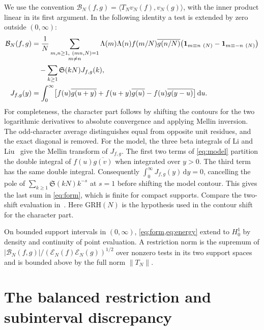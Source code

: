 \documentclass[11pt,a4paper]{article}
\numberwithin{equation}{section}
\newcommand{\SSS}{\mathfrak S}
\newcommand{\grh}{\mathrm{GRH}}
\newcommand{\ud}{\mathrm d}
\newcommand{\E}{\mathcal E_N}
\newcommand{\B}{\mathcal B_N}
\begin{document}
We use the convention $\B(f,g)=\langle T_N v_N(f),v_N(g)\rangle$,
with the inner product linear in its first argument. In the following
identity a test is extended by zero outside $(0,\infty)$:
\begin{align}
 \B(f,g)
  &=\frac1N
    \sum_{\substack{m,n\ge1,\ (mn,N)=1\\m\ne n}}
      \Lambda(m)\Lambda(n)f(m/N)\overline{g(n/N)}
      \bigl(\mathbf 1_{m\equiv n\ (N)}-\mathbf 1_{m\equiv -n\ (N)}\bigr)
    \notag\\
  &\quad-\sum_{k\ge1}\SSS(kN)J_{f,g}(k),
  \label{eq:form}\\
 J_{f,g}(y)
  &=\int_0^\infty \bigl[
      f(u)\overline{g(u+y)}
      +f(u+y)\overline{g(u)}
      -f(u)\overline{g(y-u)}
      \bigr]\,\ud u.
  \label{eq:model}
\end{align}
For completeness, the character part follows by shifting the contours for
the two logarithmic derivatives to absolute convergence and applying
Mellin inversion. The odd-character average distinguishes equal from
opposite unit residues, and the exact diagonal is removed. For the model,
the three beta integrals of Li and Liu~\cite[Lemma~7.2]{LiLiu} give the
Mellin transform of $J_{f,g}$. The first two terms of \cref{eq:model}
partition the double integral of $f(u)\overline{g(v)}$ when integrated
over $y>0$. The third term has the same double integral. Consequently
$\int_0^\infty J_{f,g}(y)\,\ud y=0$, cancelling the pole of
$\sum_{k\ge1}\SSS(kN)k^{-s}$ at $s=1$ before shifting the model contour.
This gives the last sum in \cref{eq:form}, which is finite for compact
supports. Compare the two-shift evaluation in~\cite[Lemma~2.1]{YLiu}.
Here $\grh(N)$ is the hypothesis used in the contour shift for the
character part.

On bounded support intervals in $(0,\infty)$, \cref{eq:form,eq:energy}
extend to $H^1_0$ by density and continuity of point evaluation. A
restriction norm is the supremum of $|\B(f,g)|/(\E(f)\E(g))^{1/2}$
over nonzero tests in its two support spaces and is bounded above by
the full norm $\|T_N\|$.

\section{The balanced restriction and subinterval discrepancy}
\label{sec:balanced}
\end{document}
